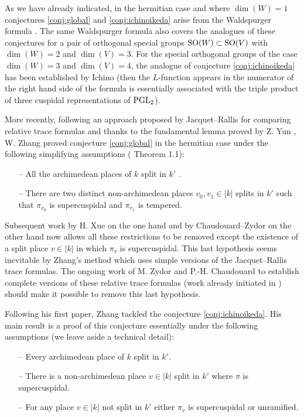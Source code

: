 As we have already indicated, in the hermitian case and where $\dim(W) = 1$ conjectures \ref{conj:global} and \ref{conj:ichinoikeda} arise from the Waldspurger formula \cite{waldspurger1985valeurs}.
The same Waldspurger formula also covers the analogues of these conjectures for a pair of orthogonal special groups $\mathrm{SO}(W) \subset \mathrm{SO}(V)$ with $\dim(W) = 2$ and $\dim(V) = 3$.
For the special orthogonal groups of the case $\dim(W) = 3$ and $\dim(V) = 4$, the analogue of conjecture \ref{conj:ichinoikeda} has been established by Ichino \cite{ichino2008trilinear} (then the $L$-function  appears in the numerator of the right hand side of the formula is essentially associated with the triple product of three cuspidal representations of $\mathrm{PGL}_2$).

More recently, following an approach proposed by Jacquet--Rallis \cite{jacquet2011gross} for comparing relative trace formulas and thanks to the fundamental lemma proved by Z. Yun \cite{yun2011fundamental}, W. Zhang proved conjecture \ref{conj:global} in the hermitian case under the following simplifying assumptions (\cite{zhang2014fourier} Theorem 1.1):
\begin{itemize}
    \item[--] All the archimedean places of $k$ split in $k'$ .
    \item[--] There are two distinct non-archimedean places $v_0, v_1 \in |k|$ splits in $k'$ such that $\pi_{v_0}$ is supercuspidal and $\pi_{v_1}$ is tempered.
\end{itemize}

Subsequent work by H. Xue \cite{xue2019global} on the one hand and by Chaudouard--Zydor \cite{chaudouard2021transfert} on the other hand now allows all these restrictions to be removed except the existence of a split place $v \in |k|$ in which $\pi_v$ is supercuspidal.
This last hypothesis seems inevitable by Zhang's method which uses simple versions of the Jacquet--Rallis trace formulas.
The ongoing work of M. Zydor and P.-H. Chaudouard to establish complete versions of these relative trace formulas (work already initiated in \cite{zydor2016variante,zydor2018variante,zydor2020formules}) should make it possible to remove this last hypothesis.


Following his first paper, Zhang \cite{zhang2014automorphic} tackled the conjecture \ref{conj:ichinoikeda}.
His main result is a proof of this conjecture essentially under the following assumptions (we leave aside a technical detail):
\begin{itemize}
    \item[--] Every archimedean place of $k$ split in $k'$.
    \item[--] There is a non-archimedean place $v\in |k|$ split in $k'$ where $\pi$ is supercuspidal.
    \item[--] For any place $v \in |k|$ not split in $k'$ either $\pi_v$ is supercuspidal or unramified.
\end{itemize}


